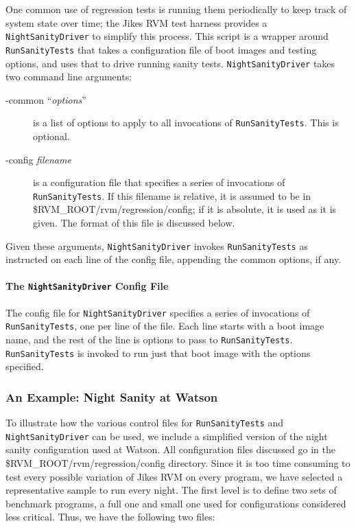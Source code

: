  One common use of regression tests is running them periodically to
keep track of system state over time; the Jikes RVM test harness
provides a {\tt{NightSanityDriver}} to simplify this process.  This
script is a wrapper around {\tt{RunSanityTests}} that takes a
configuration file of boot images and testing options, and uses that
to drive running sanity tests.  {\tt{NightSanityDriver}} takes two
command line arguments:
\begin{description}
\item[-common ``{\em{options}}''] is a list of options to apply to all
invocations of {\tt{RunSanityTests}}.  This is optional.
\item[-config {\em filename}] is a configuration file that specifies a
series of invocations of {\tt{RunSanityTests}}.  If this filename is
relative, it is assumed to be in \$RVM\_ROOT/rvm/regression/config; if
it is absolute, it is used as it is given.  The format of this file is
discussed below.
\end{description}

 Given these arguments, {\tt{NightSanityDriver}} invokes
{\tt{RunSanityTests}} as instructed on each line of the config file,
appending the common options, if any.

\paragraph{The {\tt{NightSanityDriver}} Config File}

 The config file for {\tt{NightSanityDriver}} specifies a series of
invocations of {\tt{RunSanityTests}}, one per line of the file.  Each
line starts with a boot image name, and the rest of the line is
options to pass to {\tt{RunSanityTests}}.  {\tt{RunSanityTests}} is
invoked to run just that boot image with the options specified.

\subsubsection{An Example: Night Sanity at Watson}

 To illustrate how the various control files for {\tt{RunSanityTests}}
and {\tt{NightSanityDriver}} can be used, we include a simplified
version of the night sanity configuration used at Watson.  All
configuration files discussed go in the
\$RVM\_ROOT/rvm/regression/config directory. Since it is
too time consuming to test every possible variation of Jikes RVM on
every program, we have selected a representative sample to run every
night.  The first level is to define two sets of benchmark programs, a
full one and small one used for configurations considered less
critical.  Thus, we have the following two files:

